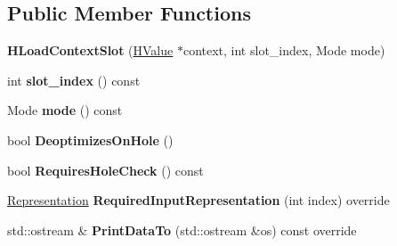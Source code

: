 \subsection*{Public Member Functions}
\begin{DoxyCompactItemize}
\item 
{\bfseries H\+Load\+Context\+Slot} (\hyperlink{classv8_1_1internal_1_1_h_value}{H\+Value} $\ast$context, int slot\+\_\+index, Mode mode)\hypertarget{classv8_1_1internal_1_1_h_load_context_slot_a3800928b2217280d469cccc4753b7150}{}\label{classv8_1_1internal_1_1_h_load_context_slot_a3800928b2217280d469cccc4753b7150}

\item 
int {\bfseries slot\+\_\+index} () const \hypertarget{classv8_1_1internal_1_1_h_load_context_slot_a434f2c8d0153d5c41478b15445a1a72b}{}\label{classv8_1_1internal_1_1_h_load_context_slot_a434f2c8d0153d5c41478b15445a1a72b}

\item 
Mode {\bfseries mode} () const \hypertarget{classv8_1_1internal_1_1_h_load_context_slot_a82fcbbbcb0698ea12e224f4947e82ce7}{}\label{classv8_1_1internal_1_1_h_load_context_slot_a82fcbbbcb0698ea12e224f4947e82ce7}

\item 
bool {\bfseries Deoptimizes\+On\+Hole} ()\hypertarget{classv8_1_1internal_1_1_h_load_context_slot_a3f67bfdd63150eb701ff72209a3d45ff}{}\label{classv8_1_1internal_1_1_h_load_context_slot_a3f67bfdd63150eb701ff72209a3d45ff}

\item 
bool {\bfseries Requires\+Hole\+Check} () const \hypertarget{classv8_1_1internal_1_1_h_load_context_slot_ad9eabe5518a45780bdb162dbd27b231f}{}\label{classv8_1_1internal_1_1_h_load_context_slot_ad9eabe5518a45780bdb162dbd27b231f}

\item 
\hyperlink{classv8_1_1internal_1_1_representation}{Representation} {\bfseries Required\+Input\+Representation} (int index) override\hypertarget{classv8_1_1internal_1_1_h_load_context_slot_af45a1e1fbc160098ea2814b06fd3fb04}{}\label{classv8_1_1internal_1_1_h_load_context_slot_af45a1e1fbc160098ea2814b06fd3fb04}

\item 
std\+::ostream \& {\bfseries Print\+Data\+To} (std\+::ostream \&os) const  override\hypertarget{classv8_1_1internal_1_1_h_load_context_slot_ae35a17c3c394e4f420eb85a7af6b87f1}{}\label{classv8_1_1internal_1_1_h_load_context_slot_ae35a17c3c394e4f420eb85a7af6b87f1}

\end{DoxyCompactItemize}
